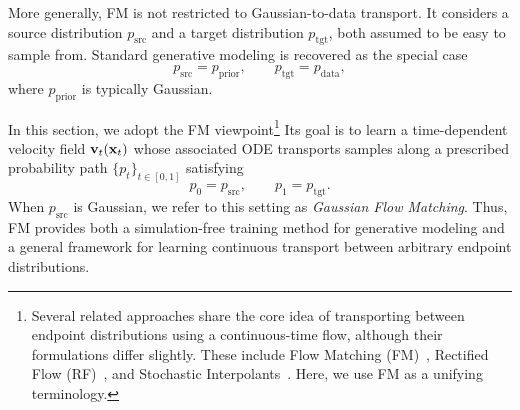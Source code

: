 More generally, FM is not restricted to Gaussian-to-data transport. It
considers a source distribution $p_{\mathrm{src}}$ and a target
distribution $p_{\mathrm{tgt}}$, both assumed to be easy to sample from.
Standard generative modeling is recovered as the special case
\[
p_{\mathrm{src}}=p_{\mathrm{prior}},
\qquad
p_{\mathrm{tgt}}=p_{\mathrm{data}},
\]
where $p_{\mathrm{prior}}$ is typically Gaussian.

In this section, we adopt the FM viewpoint\footnote{Several related
approaches share the core idea of transporting between endpoint
distributions using a continuous-time flow, although their formulations
differ slightly. These include Flow Matching
(FM)~\citep{lipman2022flow,neklyudov2023action}, Rectified Flow
(RF)~\citep{liu2022rectified,heitz2023iterative}, and Stochastic
Interpolants~\citep{albergo2023stochastic,albergobuilding,ma2024sit}.
Here, we use FM as a unifying terminology.}
Its goal is to learn a time-dependent velocity field
$\mathbf{v}_t({\mathbf{x}}_t)$ whose associated ODE transports samples along a
prescribed probability path $\{p_t\}_{t\in[0,1]}$ satisfying
\[
p_0=p_{\mathrm{src}},
\qquad
p_1=p_{\mathrm{tgt}}.
\]
When $p_{\mathrm{src}}$ is Gaussian, we refer to this setting as
\emph{Gaussian Flow Matching}. Thus, FM provides both a simulation-free
training method for generative modeling and a general framework for
learning continuous transport between arbitrary endpoint distributions.



